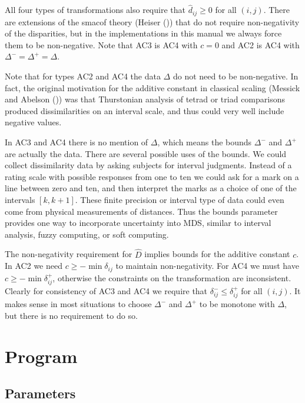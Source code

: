 \documentclass[
  12pt,
  letterpaper,
  DIV=11,
  numbers=noendperiod]{scrartcl}
\begin{document}
All four types of transformations also require that
\(\hat d_{ij}\geq 0\) for all \((i,j)\). There are extensions of the
smacof theory (Heiser ()) that do not
require non-negativity of the disparities, but in the implementations in
this manual we always force them to be non-negative. Note that AC3 is
AC4 with \(c=0\) and AC2 is AC4 with \(\Delta^-=\Delta^+=\Delta\).

Note that for types AC2 and AC4 the data \(\Delta\) do not need to be
non-negative. In fact, the original motivation for the additive constant
in classical scaling (Messick and Abelson
()) was that Thurstonian analysis
of tetrad or triad comparisons produced dissimilarities on an interval
scale, and thus could very well include negative values.

In AC3 and AC4 there is no mention of \(\Delta\), which means the bounds
\(\Delta^-\) and \(\Delta^+\) are actually the data. There are several
possible uses of the bounds. We could collect dissimilarity data by
asking subjects for interval judgments. Instead of a rating scale with
possible responses from one to ten we could ask for a mark on a line
between zero and ten, and then interpret the marks as a choice of one of
the intervals \([k, k+1]\). These finite precision or interval type of
data could even come from physical measurements of distances. Thus the
bounds parameter provides one way to incorporate uncertainty into MDS,
similar to interval analysis, fuzzy computing, or soft computing.

The non-negativity requirement for \(\hat D\) implies bounds for the
additive constant \(c\). In AC2 we need \(c\geq-\min\delta_{ij}\) to
maintain non-negativity. For AC4 we must have
\(c\geq-\min\delta_{ij}^+\), otherwise the constraints on the
transformation are inconsistent. Clearly for consistency of AC3 and AC4
we require that \(\delta_{ij}^-\leq\delta_{ij}^+\) for all \((i,j)\). It
makes sense in most situations to choose \(\Delta^-\) and \(\Delta^+\)
to be monotone with \(\Delta\), but there is no requirement to do so.

\section{Program}\label{program}

\subsection{Parameters}\label{parameters}
\end{document}

